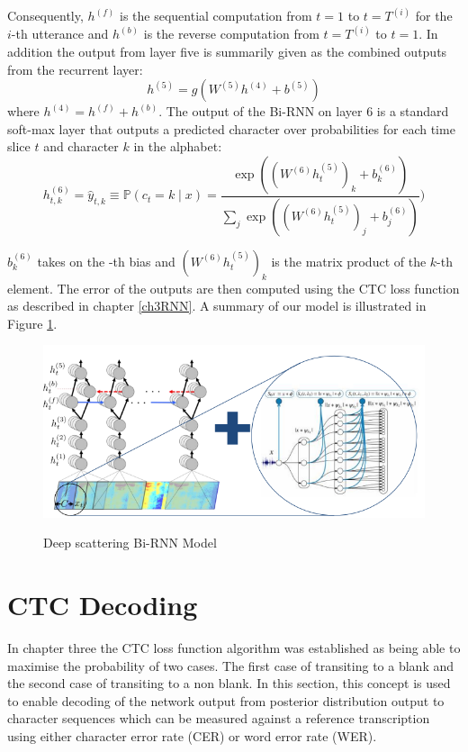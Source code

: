 Consequently, $h^{(f)}$ is the sequential computation from $t=1$ to $t=T^{(i)}$ for the $i$-th utterance and $h^{(b)}$ is the reverse computation from $t=T^{(i)}$ to $t=1$.  In addition the output from layer five is summarily given as the combined outputs from the recurrent layer:
\begin{equation}
h^{(5)} = g(W^{(5)} h^{(4)} + b^{(5)})    \label{ch06_04_l5}
\end{equation}
where $h^{(4)} = h^{(f)} + h^{(b)}$. The output of the Bi-RNN on layer 6 is a standard soft-max layer that outputs a predicted character over probabilities for each time slice $t$ and character $k$ in the alphabet:
\begin{equation}
h^{(6)}_{t,k} = \hat{y}_{t,k} \equiv \mathbb{P}(c_t = k \mid x) = \frac{\exp{ \left( (W^{(6)} h^{(5)}_t)_k + b^{(6)}_k \right)}}{\sum_j \exp{\left( (W^{(6)} h^{(5)}_t)_j + b^{(6)}_j \right)}})    \label{ch06_05_l6}
\end{equation}

$b^{(6)}_k$ takes on the -th bias and $(W^{(6)} h^{(5)}_t)_k$ is the matrix product of the $k$-th element.  The error of the outputs are then computed using the CTC loss function \cite{graves_2014} as described in chapter \ref{ch3RNN}.  A summary of our model is illustrated in Figure \ref{fig_6_1_ctc_scatter}.
\begin{figure}
\centering
  \includegraphics[width=14cm]{thesis/images/ctc_scatter.png}\\
  \caption{Deep scattering Bi-RNN Model} \label{fig_6_1_ctc_scatter}
\end{figure}

\section{CTC Decoding}

In chapter three the CTC loss function algorithm was established as being able to maximise the probability of two cases.  The first case of transiting to a blank and the second case of transiting to a non blank.  In this section, this concept is used to enable decoding of the network output from posterior distribution output to character sequences which can be measured against a reference transcription using either character error rate (CER) or word error rate (WER).

